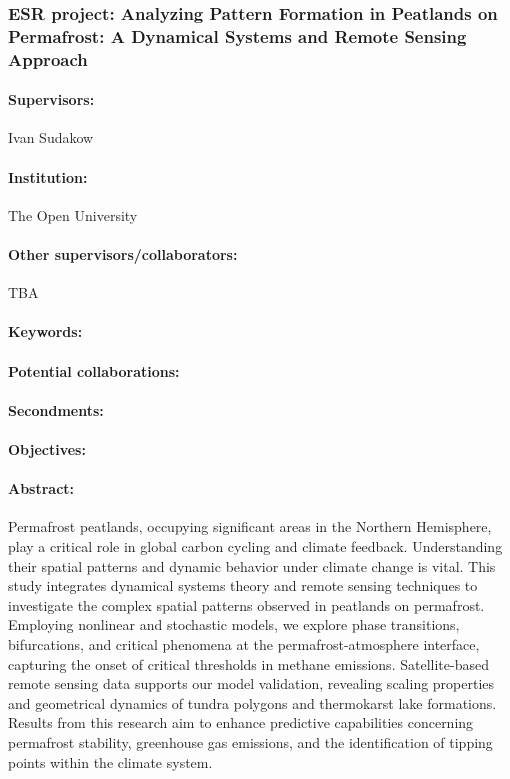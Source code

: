 \documentclass[12pt]{article}
\begin{document}
\subsubsection*{ESR project: Analyzing Pattern Formation in Peatlands on Permafrost: A Dynamical Systems and Remote Sensing Approach}
\paragraph{Supervisors:} Ivan Sudakow
\paragraph{Institution:} The Open University
\paragraph{Other supervisors/collaborators:} TBA
\paragraph{Keywords:} 
\paragraph{Potential collaborations:} 
\paragraph{Secondments:} 
\paragraph{Objectives:} 
\paragraph{Abstract:} Permafrost peatlands, occupying significant areas in the Northern Hemisphere, play a critical role in global carbon cycling and climate feedback. Understanding their spatial patterns and dynamic behavior under climate change is vital. This study integrates dynamical systems theory and remote sensing techniques to investigate the complex spatial patterns observed in peatlands on permafrost. Employing nonlinear and stochastic models, we explore phase transitions, bifurcations, and critical phenomena at the permafrost-atmosphere interface, capturing the onset of critical thresholds in methane emissions. Satellite-based remote sensing data supports our model validation, revealing scaling properties and geometrical dynamics of tundra polygons and thermokarst lake formations. Results from this research aim to enhance predictive capabilities concerning permafrost stability, greenhouse gas emissions, and the identification of tipping points within the climate system.
\end{document}
